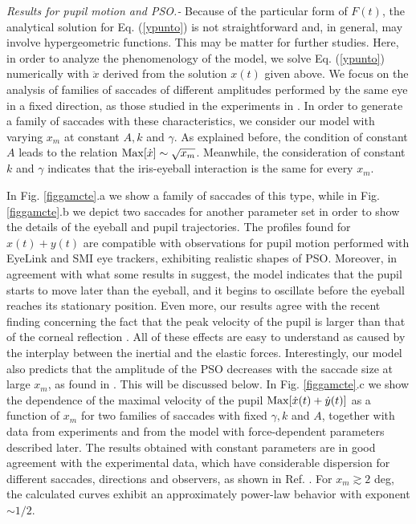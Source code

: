 \documentclass[prl]{revtex4}
\begin{document}
{\em Results for pupil motion and PSO.-} Because of the particular form of $F(t)$, the analytical solution for Eq. (\ref{ypunto}) is not straightforward and, in general, may involve hypergeometric functions. This may be matter for further studies. Here, in order to analyze the phenomenology of the model, we solve Eq. (\ref{ypunto}) numerically with $\ddot{x}$ derived from the solution $x(t)$ given above. We focus on the analysis of families of saccades of different amplitudes performed by the same eye in a fixed direction, as those studied in the experiments in \cite{holm}. In order to generate a family of saccades with these characteristics, we consider our model with varying $x_m$ at constant $A, k$ and $\gamma$. As explained before, the condition of constant $A$ leads to the relation ${\rm Max}[\dot{x}]\sim \sqrt{x_m}$. Meanwhile, the consideration of constant $k$ and $\gamma$ indicates that the iris-eyeball interaction is the same for 
every $x_m$. 

In Fig. \ref{figgamcte}.a we show a family of saccades of this type, while in Fig. \ref{figgamcte}.b we depict two saccades for another parameter set in order to show the details of the eyeball and pupil trajectories. The profiles found for $x(t)+y(t)$ are compatible with observations for pupil motion performed with EyeLink \cite{holm,gasaneo2017} and SMI \cite{holm,holm2016} eye trackers, exhibiting realistic shapes of PSO. Moreover, in agreement with what some results in \cite{holm2016} suggest, the model indicates that the pupil starts to move later than the eyeball, and it begins to oscillate before the eyeball reaches its stationary position. Even more, our results agree with the recent finding concerning the fact that the peak velocity of the pupil is larger than that of the corneal reflection \cite{holm2016}. All of these effects are easy to understand as caused by the interplay between the inertial and the elastic forces. Interestingly, our model also predicts that the amplitude of the PSO decreases with the saccade size at large $x_m$, as found in \cite{holm}. This will be discussed below. In Fig. \ref{figgamcte}.c  we show the dependence of the maximal velocity of the pupil ${\rm Max}[\dot{x}(t)+\dot{y}(t)]$ as a function of $x_m$ for two families of saccades with fixed $\gamma, k$ and $A$, together with data from experiments and from the model with force-dependent parameters described later. The results obtained with constant parameters are in good agreement with the experimental data, which have considerable dispersion for different saccades, directions and observers, as shown in Ref. \cite{gasaneo2017}. For $x_m\gtrsim 2$ deg, the calculated curves exhibit an approximately power-law behavior with exponent $\sim 1/2$.
\end{document}
